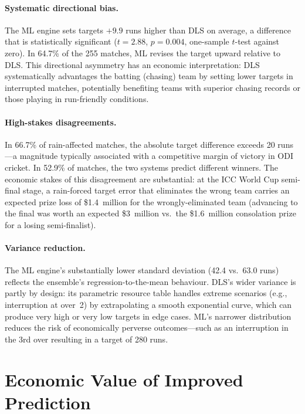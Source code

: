 \documentclass[12pt,a4paper,oneside]{report}
\begin{document}
\paragraph{Systematic directional bias.}  The ML engine sets targets $+9.9$ runs higher than DLS on average, a difference that is statistically significant ($t=2.88$, $p=0.004$, one-sample $t$-test against zero).  In 64.7\% of the 255 matches, ML revises the target upward relative to DLS.  This directional asymmetry has an economic interpretation: DLS systematically advantages the batting (chasing) team by setting lower targets in interrupted matches, potentially benefiting teams with superior chasing records or those playing in run-friendly conditions.

\paragraph{High-stakes disagreements.}  In 66.7\% of rain-affected matches, the absolute target difference exceeds 20 runs---a magnitude typically associated with a competitive margin of victory in ODI cricket.  In 52.9\% of matches, the two systems predict different winners.  The economic stakes of this disagreement are substantial: at the ICC World Cup semi-final stage, a rain-forced target error that eliminates the wrong team carries an expected prize loss of \$1.4~million for the wrongly-eliminated team (advancing to the final was worth an expected \$3~million vs.\ the \$1.6~million consolation prize for a losing semi-finalist).

\paragraph{Variance reduction.}  The ML engine's substantially lower standard deviation (42.4 vs.\ 63.0 runs) reflects the ensemble's regression-to-the-mean behaviour.  DLS's wider variance is partly by design: its parametric resource table handles extreme scenarios (e.g., interruption at over~2) by extrapolating a smooth exponential curve, which can produce very high or very low targets in edge cases.  ML's narrower distribution reduces the risk of economically perverse outcomes---such as an interruption in the 3rd over resulting in a target of 280 runs.

\section{Economic Value of Improved Prediction}
\label{sec:econ_value}
\end{document}
